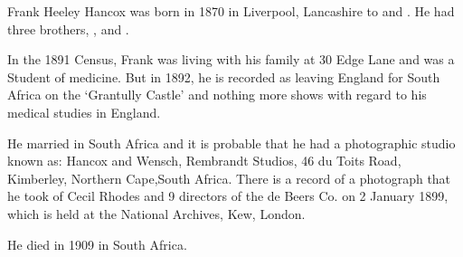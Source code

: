 
Frank Heeley Hancox was born in 1870 in Liverpool, Lancashire to  and  \cite{FHHancoxBirth}. He had three brothers, ,  and .

In the 1891 Census, Frank was living with his family at 30 Edge Lane and was a Student of medicine.\cite{FrankHeeleyHancoxResidenceUK}
But in 1892, he is recorded as leaving England for South Africa on the `Grantully Castle' \cite{FHHancoxTravel} and nothing more shows with regard to his medical studies in England.

He married  in South Africa and it is probable that he had a photographic studio known as: Hancox and Wensch, Rembrandt Studios, 46 du Toits Road, Kimberley, Northern Cape,South Africa. There is a record of a photograph that he took of Cecil Rhodes and 9 directors of the de Beers Co. on 2 January 1899, which is held at the National Archives, Kew, London.  \cite{FHHancoxPhotos}

He died in 1909 in South Africa. \cite{FHHancoxDeath}
